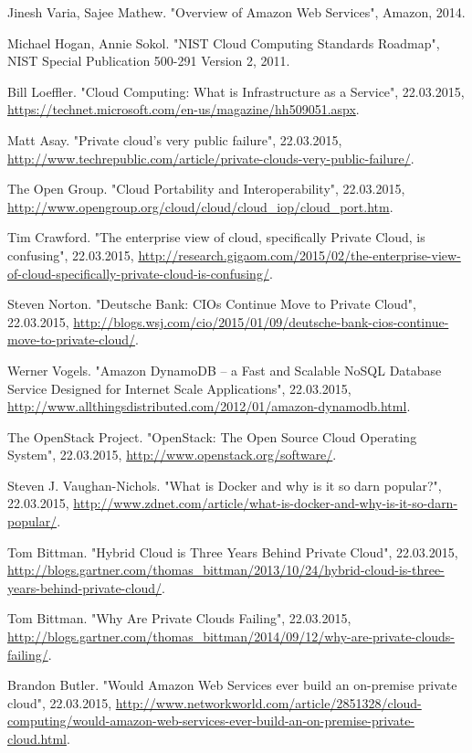 \begin{thebibliography}{1}
Jinesh Varia, Sajee Mathew. "Overview of Amazon Web Services", Amazon, 2014.

Michael Hogan, Annie Sokol. "NIST Cloud Computing Standards Roadmap", NIST Special Publication 500-291 Version 2, 2011.

Bill Loeffler. "Cloud Computing: What is Infrastructure as a Service", 22.03.2015, \url{https://technet.microsoft.com/en-us/magazine/hh509051.aspx}.

Matt Asay. "Private cloud's very public failure", 22.03.2015, \url{http://www.techrepublic.com/article/private-clouds-very-public-failure/}.

The Open Group. "Cloud Portability and Interoperability", 22.03.2015, \url{http://www.opengroup.org/cloud/cloud/cloud_iop/cloud_port.htm}.

Tim Crawford. "The enterprise view of cloud, specifically Private Cloud, is confusing", 22.03.2015, \url{http://research.gigaom.com/2015/02/the-enterprise-view-of-cloud-specifically-private-cloud-is-confusing/}.

Steven Norton. "Deutsche Bank: CIOs Continue Move to Private Cloud", 22.03.2015, \url{http://blogs.wsj.com/cio/2015/01/09/deutsche-bank-cios-continue-move-to-private-cloud/}.

Werner Vogels. "Amazon DynamoDB – a Fast and Scalable NoSQL Database Service Designed for Internet Scale Applications", 22.03.2015, \url{http://www.allthingsdistributed.com/2012/01/amazon-dynamodb.html}.

The OpenStack Project. "OpenStack: The Open Source Cloud Operating System", 22.03.2015, \url{http://www.openstack.org/software/}.

Steven J. Vaughan-Nichols. "What is Docker and why is it so darn popular?", 22.03.2015, \url{http://www.zdnet.com/article/what-is-docker-and-why-is-it-so-darn-popular/}.

Tom Bittman. "Hybrid Cloud is Three Years Behind Private Cloud", 22.03.2015, \url{http://blogs.gartner.com/thomas_bittman/2013/10/24/hybrid-cloud-is-three-years-behind-private-cloud/}.

Tom Bittman. "Why Are Private Clouds Failing", 22.03.2015, \url{http://blogs.gartner.com/thomas_bittman/2014/09/12/why-are-private-clouds-failing/}.

Brandon Butler. "Would Amazon Web Services ever build an on-premise private cloud", 22.03.2015, \url{http://www.networkworld.com/article/2851328/cloud-computing/would-amazon-web-services-ever-build-an-on-premise-private-cloud.html}.

\end{thebibliography}